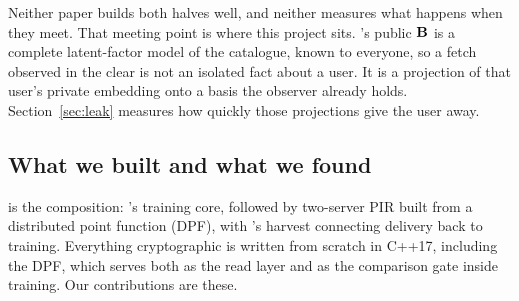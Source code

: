Neither paper builds both halves well, and neither measures what happens when
they meet. That meeting point is where this project sits. \nudgeplain{}'s public
$\mathbf{B}$ is a complete latent-factor model of the catalogue, known to
everyone, so a fetch observed in the clear is not an isolated fact about a user.
It is a projection of that user's private embedding onto a basis the observer
already holds. Section~\ref{sec:leak} measures how quickly those projections
give the user away.

\subsection{What we built and what we found}
\label{sec:intro:contrib}

\sys{} is the composition: \nudgeplain{}'s training core, followed by
two-server PIR built from a distributed point function (DPF), with
\pirsonaplain{}'s harvest connecting delivery back to training. Everything
cryptographic is written from scratch in C++17, including the DPF, which serves
both as the read layer and as the comparison gate inside training. Our
contributions are these.

